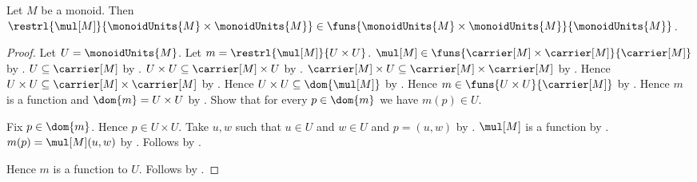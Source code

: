 \begin{proposition}\label{monoid_unit_mul_restriction_type}
    Let $M$ be a monoid.
    Then $\restrl{\mul[M]}{
        \monoidUnits{M}\times\monoidUnits{M}}
        \in\funs{
            \monoidUnits{M}\times\monoidUnits{M}}{
            \monoidUnits{M}}$.
\end{proposition}
\begin{proof}
    Let $U=\monoidUnits{M}$.
    Let $m=\restrl{\mul[M]}{U\times U}$.
    $\mul[M]\in
        \funs{\carrier[M]\times\carrier[M]}{\carrier[M]}$ by
        .
    $U\subseteq\carrier[M]$ by .
    $U\times U\subseteq\carrier[M]\times U$ by
        .
    $\carrier[M]\times U\subseteq
        \carrier[M]\times\carrier[M]$ by
        .
    Hence $U\times U\subseteq
        \carrier[M]\times\carrier[M]$ by
        .
    Hence $U\times U\subseteq\dom{\mul[M]}$ by .
    Hence $m\in\funs{U\times U}{\carrier[M]}$ by
        .
    Hence $m$ is a function and $\dom{m}=U\times U$ by
        .
    Show that for every $p\in\dom{m}$ we have $m(p)\in U$.
    \begin{subproof}
        Fix $p\in\dom{m}$.
        Hence $p\in U\times U$.
        Take $u,w$ such that $u\in U$ and $w\in U$ and
            $p=(u,w)$ by .
        $\mul[M]$ is a function by .
        $m(p)=\mul[M](u,w)$ by
            .
        Follows by .
    \end{subproof}
    Hence $m$ is a function to $U$.
    Follows by .
\end{proof}


